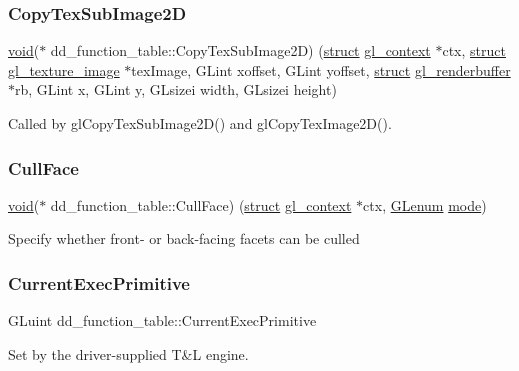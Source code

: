\subsubsection{\texorpdfstring{Copy\+Tex\+Sub\+Image2D}{CopyTexSubImage2D}}
{\footnotesize\ttfamily \hyperlink{interfacevoid}{void}($\ast$ dd\+\_\+function\+\_\+table\+::\+Copy\+Tex\+Sub\+Image2D) (\hyperlink{interfacestruct}{struct} \hyperlink{structgl__context}{gl\+\_\+context} $\ast$ctx, \hyperlink{interfacestruct}{struct} \hyperlink{structgl__texture__image}{gl\+\_\+texture\+\_\+image} $\ast$tex\+Image, G\+Lint xoffset, G\+Lint yoffset, \hyperlink{interfacestruct}{struct} \hyperlink{structgl__renderbuffer}{gl\+\_\+renderbuffer} $\ast$rb, G\+Lint x, G\+Lint y, G\+Lsizei width, G\+Lsizei height)}

Called by gl\+Copy\+Tex\+Sub\+Image2\+D() and gl\+Copy\+Tex\+Image2\+D(). \mbox{\label{structdd__function__table_ab5de002676624683a137641cf9053901}} 
\subsubsection{\texorpdfstring{Cull\+Face}{CullFace}}
{\footnotesize\ttfamily \hyperlink{interfacevoid}{void}($\ast$ dd\+\_\+function\+\_\+table\+::\+Cull\+Face) (\hyperlink{interfacestruct}{struct} \hyperlink{structgl__context}{gl\+\_\+context} $\ast$ctx, \hyperlink{interfacevoid}{G\+Lenum} \hyperlink{interfacevoid}{mode})}

Specify whether front-\/ or back-\/facing facets can be culled \mbox{\label{structdd__function__table_aa5cd1d1d6f24c6dc8cfd143e299963f5}} 
\subsubsection{\texorpdfstring{Current\+Exec\+Primitive}{CurrentExecPrimitive}}
{\footnotesize\ttfamily G\+Luint dd\+\_\+function\+\_\+table\+::\+Current\+Exec\+Primitive}

Set by the driver-\/supplied T\&L engine.


